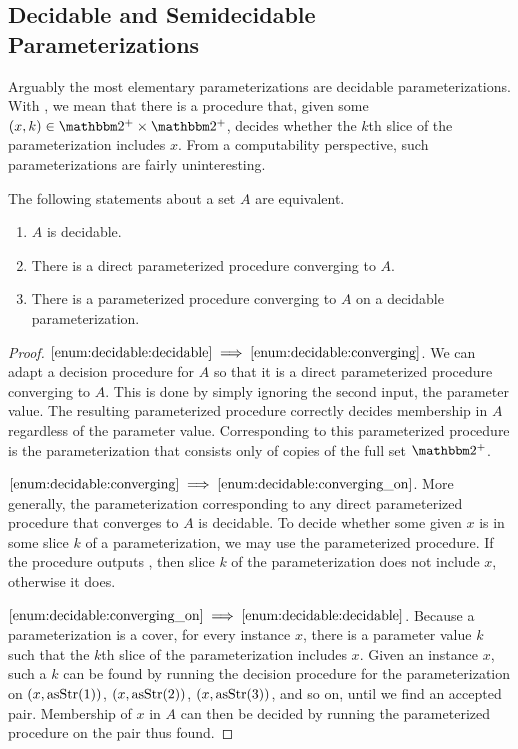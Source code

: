 \subsection{Decidable and Semidecidable Parameterizations}
Arguably the most elementary parameterizations are decidable parameterizations.
With , we mean that there is a procedure that, given some $(x, k) \in \binary^+ \times \binary^+$, decides whether the $k$th slice of the parameterization includes $x$.
From a computability perspective, such parameterizations are fairly uninteresting.
\begin{theorem}
\label{thm:decidable}%
  The following statements about a set $A$ are equivalent.
  \begin{enumerate}[series=enum:decidable]
  \item\label{enum:decidable:decidable}
    $A$ is decidable.
  \item\label{enum:decidable:converging}
    There is a direct parameterized procedure converging to $A$.
  \item\label{enum:decidable:converging_on}
    There is a parameterized procedure converging to $A$ on a decidable parameterization.
  \end{enumerate}
\end{theorem}
\begin{proof}
$\ref{enum:decidable:decidable} \implies \ref{enum:decidable:converging}$.
  We can adapt a decision procedure for $A$ so that it is a direct parameterized procedure converging to $A$.
  This is done by simply ignoring the second input, the parameter value.
  The resulting parameterized procedure correctly decides membership in $A$ regardless of the parameter value.
  Corresponding to this parameterized procedure is the parameterization that consists only of copies of the full set $\binary^+$.

$\ref{enum:decidable:converging} \implies \ref{enum:decidable:converging_on}$.
  More generally, the parameterization corresponding to any direct parameterized procedure that converges to $A$ is decidable.
  To decide whether some given $x$ is in some slice $k$ of a parameterization, we may use the parameterized procedure.
  If the procedure outputs , then slice $k$ of the parameterization does not include $x$, otherwise it does.

$\ref{enum:decidable:converging_on} \implies \ref{enum:decidable:decidable}$.
  Because a parameterization is a cover, for every instance $x$, there is a parameter value $k$ such that the $k$th slice of the parameterization includes $x$.
  Given an instance $x$, such a $k$ can be found by running the decision procedure for the parameterization on $(x, \operatorname{asStr}(1))$, $(x, \operatorname{asStr}(2))$, $(x, \operatorname{asStr}(3))$, and so on, until we find an accepted pair.
  Membership of $x$ in $A$ can then be decided by running the parameterized procedure on the pair thus found.
\end{proof}

